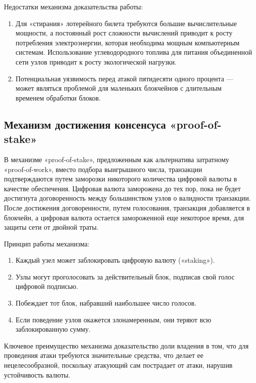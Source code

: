 Недостатки механизма доказательства работы:

\begin{enumerate} 
  \item Для «стирания» лотерейного билета требуются большие вычислительные мощности, а постоянный рост сложности вычислений приводит к росту потребления электроэнергии, которая необходима мощным компьютерным системам. Использование углеводородного топлива для питания объединенной сети узлов приводит к росту экологической нагрузки.
  
  \item Потенциальная уязвимость перед атакой пятидесяти одного процента — может являться проблемой для маленьких блокчейнов с длительным временем обработки блоков.
\end{enumerate}

\subsection{Механизм достижения консенсуса «proof-of-stake»}

В механизме «proof-of-stake», предложенным как альтернатива затратному «proof-of-work», вместо подбора выигрышного числа, транзакции подтверждаются путем заморозки никоторого количества цифровой валюты в качестве обеспечения. Цифровая валюта заморожена до тех пор, пока не будет достигнута договоренность между большинством узлов о валидности транзакции. После достижения договоренности, путем голосования, транзакция добавляется в блокчейн, а цифровая валюта остается замороженной еще некоторое время, для защиты сети от двойной траты.

Принцип работы механизма:

\begin{enumerate} 
  \item Каждый узел может заблокировать цифровую валюту («staking»).
  
  \item Узлы могут проголосовать за действительный блок, подписав свой голос цифровой подписью.
  
  \item Побеждает тот блок, набравший наибольшее число голосов.
  
  \item Если поведение узлов окажется злонамеренным, они теряют всю заблокированную сумму.
\end{enumerate}

Ключевое преимущество механизма доказательство доли владения в том, что для проведения атаки требуются значительные средства, что делает ее нецелесообразной, поскольку атакующий сам пострадает от атаки, нарушив устойчивость валюты.

